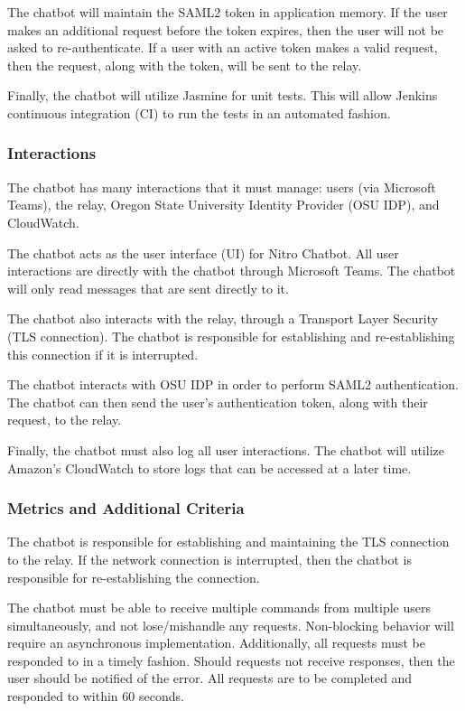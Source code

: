 \documentclass[onecolumn, draftclsnofoot,10pt, compsoc]{IEEEtran}
\begin{document}
The chatbot will maintain the SAML2 token in application memory.
If the user makes an additional request before the token expires, then the user will not be asked to re-authenticate.
If a user with an active token makes a valid request, then the request, along with the token, will be sent to the relay.

Finally, the chatbot will utilize Jasmine for unit tests. This will allow Jenkins continuous integration (CI) to run the tests in an automated fashion.

\subsubsection{Interactions}
The chatbot has many interactions that it must manage: users (via Microsoft Teams), the relay, Oregon State University Identity Provider (OSU IDP), and CloudWatch.

The chatbot acts as the user interface (UI) for Nitro Chatbot.
All user interactions are directly with the chatbot through Microsoft Teams.
The chatbot will only read messages that are sent directly to it.

The chatbot also interacts with the relay, through a Transport Layer Security (TLS connection).
The chatbot is responsible for establishing and re-establishing this connection if it is interrupted.

The chatbot interacts with OSU IDP in order to perform SAML2 authentication.
The chatbot can then send the user's authentication token, along with their request, to the relay.

Finally, the chatbot must also log all user interactions.
The chatbot will utilize Amazon's CloudWatch to store logs that can be accessed at a later time.

\subsubsection{Metrics and Additional Criteria}
The chatbot is responsible for establishing and maintaining the TLS connection to the relay.
If the network connection is interrupted, then the chatbot is responsible for re-establishing the connection.

The chatbot must be able to receive multiple commands from multiple users simultaneously, and not lose/mishandle any requests.
Non-blocking behavior will require an asynchronous implementation.
Additionally, all requests must be responded to in a timely fashion.
Should requests not receive responses, then the user should be notified of the error.
All requests are to be completed and responded to within 60 seconds.
\end{document}
